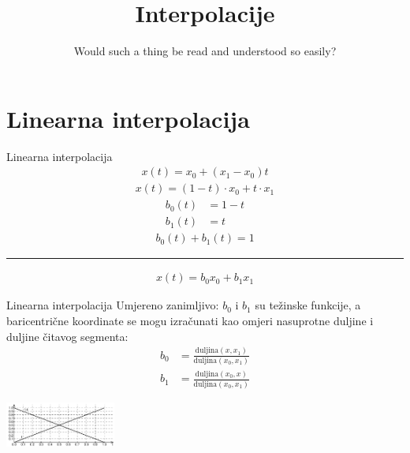 \documentclass[9pt]{beamer}
\title{Interpolacije}
\subtitle{ Would such a thing be read and understood so easily?}
\institute{Računalna grafika}
\begin{document}
\begin{frame}
 \titlepage
\end{frame}

\section{Linearna interpolacija}
\begin{frame}{Linearna interpolacija}
	\begin{align*}
	x(t) = x_0 + (x_1-x_0)t
	\end{align*}
	\begin{align*}
	x(t) = (1-t)\cdot x_0 + t\cdot x_1
	\end{align*}
	\begin{align*}
	b_0(t) & = 1-t \\
	b_1(t) & = t
 	\end{align*}
 	\begin{align*}
 	b_0(t) + b_1(t) = 1
 	\end{align*}
 	\hrule\hfill
 	\begin{align*}
 	x(t) = b_0 x_0 + b_1 x_1
 	\end{align*}
\end{frame}
\begin{frame}{Linearna interpolacija}
	Umjereno zanimljivo: $b_0$ i $b_1$ su težinske funkcije, a baricentrične koordinate se mogu izračunati kao omjeri nasuprotne duljine i duljine čitavog segmenta:
	\begin{align*}
	b_0 & = \frac{\textrm{duljina}(x, x_1)}{\textrm{duljina}(x_0, x_1)} \\
	b_1 & = \frac{\textrm{duljina}(x_0, x)}{\textrm{duljina}(x_0, x_1)}
	\end{align*}
	\begin{center}
		\includegraphics[height=1.5cm]{./slike/lin_interp_01.png}
	\end{center}
\end{frame}
\end{document}
